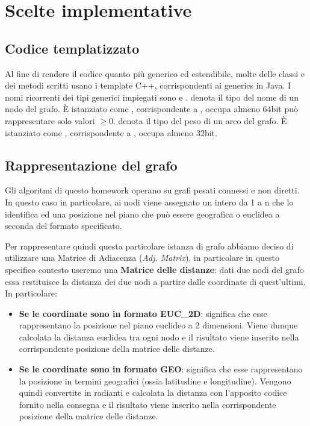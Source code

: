 \section{Scelte implementative}
\label{cap:implementation-choices}

\subsection{Codice templatizzato}

Al fine di rendere il codice quanto più generico ed estendibile, molte delle classi e dei metodi scritti
usano i template C++, corrispondenti ai generics in Java.
I nomi ricorrenti dei tipi generici impiegati sono  e .
 denota il tipo del nome di un nodo del grafo. È istanziato come , corrispondente a , occupa almeno 64bit può rappresentare solo valori $\geq 0$.
 denota il tipo del peso di un arco del grafo. È istanziato come , corrispondente a ,
occupa almeno 32bit.

\subsection{Rappresentazione del grafo}
\label{sub:graph-representation}

Gli algoritmi di questo homework operano su grafi pesati connessi e non diretti. In questo caso in particolare, ai nodi viene assegnato un intero da 1 a n che lo identifica ed una posizione nel piano che può essere geografica o euclidea a seconda del formato specificato.

\noindent Per rappresentare quindi questa particolare istanza di grafo abbiamo deciso di utilizzare una Matrice di Adiacenza (\textit{Adj. Matrix}), in particolare in questo specifico contesto useremo una \textbf{Matrice delle distanze}: dati due nodi del grafo essa restituisce la distanza dei due nodi a partire dalle coordinate di quest'ultimi. In particolare:
\begin{itemize}
    \item \textbf{Se le coordinate sono in formato EUC\_2D}: significa che esse rappresentano la posizione nel piano euclideo a 2 dimensioni. Viene dunque calcolata la distanza euclidea tra ogni nodo e il risultato viene inserito nella corrispondente posizione della matrice delle distanze.
    \item \textbf{Se le coordinate sono in formato GEO}: significa che esse rappresentano la posizione in termini geografici (ossia latitudine e longitudine). Vengono quindi convertite in radianti e calcolata la distanza con l'apposito codice fornito nella consegna e il risultato viene inserito nella corrispondente posizione della matrice delle distanze.
\end{itemize}

